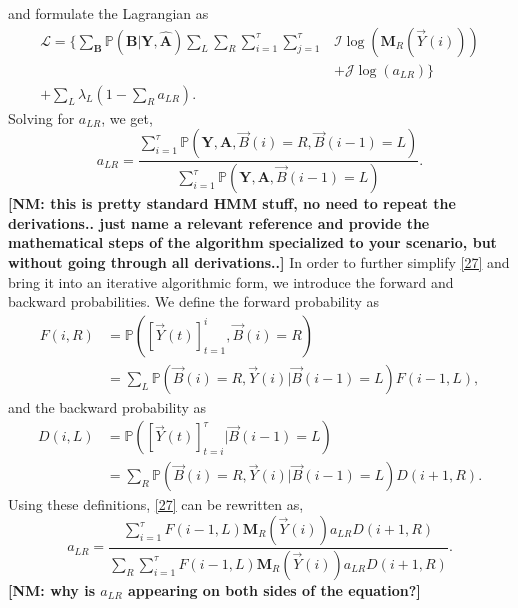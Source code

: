 \documentclass[10pt,twocolumn]{IEEEtran}
\newcommand{\nm}[1]{{\color{blue}\bf{[NM: #1]}}}
\begin{document}
and formulate the Lagrangian as
\begin{equation}\label{26}
    \begin{aligned}
        \mathcal{L}=\Big\{\sum_{\mathbf{B}}\mathbb{P}(\mathbf{B}|\mathbf{Y},\hat{\mathbf{A}})\sum_{L}\sum_{R}\sum_{i=1}^{\tau}\sum_{j=1}^{\tau}&\mathcal{I}\log(\mathbf{M}_R(\vec{Y}(i)))\\
        &+\mathcal{J}\log(a_{LR})\Big\}\\
        +\sum_{L}\lambda_L(1-\sum_Ra_{LR}).
    \end{aligned}
\end{equation}
Solving for $a_{LR}$, we get,
\begin{equation}\label{27}
    a_{LR} = \frac{\sum_{i=1}^{\tau}\mathbb{P}(\mathbf{Y},\mathbf{A},\vec{B}(i)=R,\vec{B}(i-1)=L)}{\sum_{i=1}^{\tau}\mathbb{P}(\mathbf{Y},\mathbf{A},\vec{B}(i-1)=L)}.
\end{equation}
\nm{this is pretty standard HMM stuff, no need to repeat the derivations.. just name a relevant reference and provide the mathematical steps of the algorithm specialized to your scenario, but without going through all derivations..}
In order to further simplify \eqref{27} and bring it into an iterative algorithmic form, we introduce the forward and backward probabilities. We define the forward probability as
\begin{equation}\label{28}
    \begin{aligned}
        F(i,R) &= \mathbb{P}([\vec{Y}(t)]_{t=1}^{i},\vec{B}(i)=R)\\
        &= 
        \sum_{L}\mathbb{P}(\vec{B}(i)=R,\vec{Y}(i)|\vec{B}(i-1)=L)F(i-1,L),
    \end{aligned}
\end{equation}
and the backward probability as
\begin{equation}\label{29}
    \begin{aligned}
        D(i,L) &= \mathbb{P}([\vec{Y}(t)]_{t=i}^{\tau}|\vec{B}(i-1)=L)\\
        &= \sum_{R}\mathbb{P}(\vec{B}(i)=R,\vec{Y}(i)|\vec{B}(i-1)=L)D(i+1,R).
    \end{aligned}
\end{equation}
Using these definitions, \eqref{27} can be rewritten as,
\begin{equation}\label{30}
    a_{LR} = \frac{\sum_{i=1}^{\tau}F(i-1,L)\mathbf{M}_R(\vec{Y}(i))a_{LR}D(i+1,R)}{\sum_R\sum_{i=1}^{\tau}F(i-1,L)\mathbf{M}_R(\vec{Y}(i))a_{LR}D(i+1,R)}.
\end{equation}
\nm{why is $a_{LR}$ appearing on both sides of the equation?}
\end{document}

